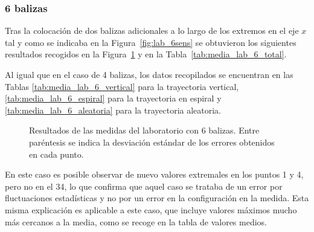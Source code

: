 
\subsubsection{6 balizas}
Tras la colocación de dos balizas adicionales a lo largo de los extremos en el eje $x$ tal y como se indicaba en la Figura~\ref{fig:lab_6sens} se obtuvieron los siguientes resultados recogidos en la Figura~\ref{fig:res_lab} y en la Tabla~\ref{tab:media_lab_6_total}.

Al igual que en el caso de 4 balizas, los datos recopilados se encuentran en las Tablas \ref{tab:media_lab_6_vertical} para la trayectoria vertical, \ref{tab:media_lab_6_espiral} para la trayectoria en espiral y \ref{tab:media_lab_6_aleatoria} para la trayectoria aleatoria.

\begin{figure}[H]
    \centering
    
    \caption{Resultados de las medidas del laboratorio con 6 balizas. \newline Entre paréntesis se indica la desviación estándar de los errores obtenidos en cada punto.}
    \label{fig:res_lab}
\end{figure}

En este caso es posible observar de nuevo valores extremales en los puntos 1 y 4, pero no en el 34, lo que confirma que aquel caso se trataba de un error por fluctuaciones estadísticas y no por un error en la configuración en la medida.
Esta misma explicación es aplicable a este caso, que incluye valores máximos mucho más cercanos a la media, como se recoge en la tabla de valores medios.

